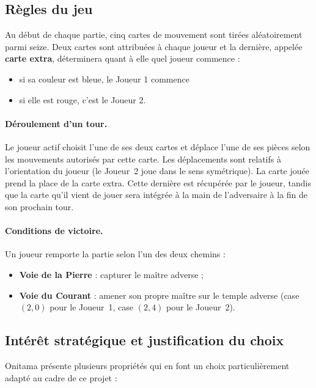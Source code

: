 \documentclass[12pt, a4paper]{article}
\begin{document}
\subsection{Règles du jeu}

Au début de chaque partie, cinq cartes de mouvement sont tirées aléatoirement parmi seize.
Deux cartes sont attribuées à chaque joueur et la dernière, appelée \textbf{carte extra}, déterminera quant à elle
quel joueur commence :
\begin{itemize}
    \item si sa couleur est bleue, le Joueur 1 commence
    \item si elle est rouge, c'est le Joueur 2.
\end{itemize}


\paragraph{Déroulement d'un tour.} Le joueur actif choisit l'une de ses deux cartes et
déplace l'une de ses pièces selon les mouvements autorisés par cette carte. Les déplacements
sont relatifs à l'orientation du joueur (le Joueur~2 joue dans le sens symétrique). La carte jouée prend la place de la carte extra. Cette dernière est récupérée par le joueur, tandis que la carte qu'il vient de jouer sera intégrée à la main de l'adversaire à la fin de son prochain tour.

\paragraph{Conditions de victoire.} Un joueur remporte la partie selon l'un des deux chemins :
\begin{itemize}[leftmargin=*]
  \item \textbf{Voie de la Pierre} : capturer le maître adverse ;
  \item \textbf{Voie du Courant} : amener son propre maître sur le temple adverse
        (case $(2, 0)$ pour le Joueur~1, case $(2, 4)$ pour le Joueur~2).
\end{itemize}

\subsection{Intérêt stratégique et justification du choix}

Onitama présente plusieurs propriétés qui en font un choix particulièrement adapté au cadre
de ce projet :
\end{document}
